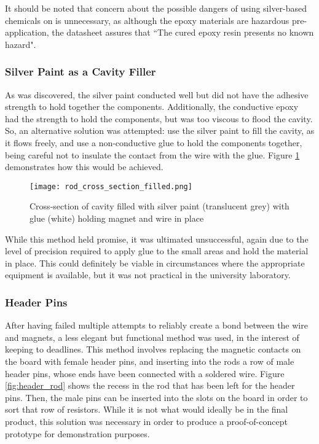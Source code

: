 It should be noted that concern about the possible dangers of using silver-based chemicals on is unnecessary, as although the epoxy materials are hazardous pre-application, the datasheet assures that ``The cured epoxy resin presents no known hazard".

\subsubsection{Silver Paint as a Cavity Filler}

As was discovered, the silver paint conducted well but did not have the adhesive strength to hold together the components. Additionally, the conductive epoxy had the strength to hold the components, but was too viscous to flood the cavity. So, an alternative solution was attempted: use the silver paint to fill the cavity, as it flows freely, and use a non-conductive glue to hold the components together, being careful not to insulate the contact from the wire with the glue. Figure \ref{fig:rod_cross_section_filled} demonstrates how this would be achieved. 
	
\begin{figure}[H]
	\begin{center}
	\texttt{[image: rod\_cross\_section\_filled.png]}\\ 
  	\caption{Cross-section of cavity filled with silver paint (translucent grey) with glue (white) holding magnet and wire in place}
    \label{fig:rod_cross_section_filled}
    \end{center}
\end{figure}

While this method held promise, it was ultimated unsuccessful, again due to the level of precision required to apply glue to the small areas and hold the material in place. This could definitely be viable in circumstances where the appropriate equipment is available, but it was not practical in the university laboratory. 

\subsubsection{Header Pins}
\label{sec:header_pins}
After having failed multiple attempts to reliably create a bond between the wire and magnets, a less elegant but functional method was used, in the interest of keeping to deadlines. This method involves replacing the magnetic contacts on the board with female header pins, and inserting into the rods a row of male header pins, whose ends have been connected with a soldered wire. Figure \ref{fig:header_rod} shows the recess in the rod that has been left for the header pins. Then, the male pins can be inserted into the slots on the board in order to sort that row of resistors. While it is not what would ideally be in the final product, this solution was necessary in order to produce a proof-of-concept prototype for demonstration purposes.

